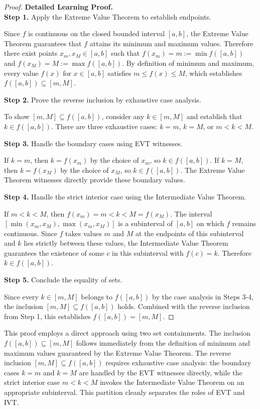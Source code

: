 \begin{proof}
\textbf{Detailed Learning Proof.}~\\

\textbf{Step 1.} Apply the Extreme Value Theorem to establish endpoints.

Since $f$ is continuous on the closed bounded interval $[a,b]$, the Extreme Value Theorem guarantees that $f$ attains its minimum and maximum values. Therefore there exist points $x_m, x_M \in [a,b]$ such that $f(x_m) = m := \min f([a,b])$ and $f(x_M) = M := \max f([a,b])$. By definition of minimum and maximum, every value $f(x)$ for $x \in [a,b]$ satisfies $m \leq f(x) \leq M$, which establishes $f([a,b]) \subseteq [m, M]$.

\textbf{Step 2.} Prove the reverse inclusion by exhaustive case analysis.

To show $[m,M] \subseteq f([a,b])$, consider any $k \in [m,M]$ and establish that $k \in f([a,b])$. There are three exhaustive cases: $k = m$, $k = M$, or $m < k < M$.

\textbf{Step 3.} Handle the boundary cases using EVT witnesses.

If $k = m$, then $k = f(x_m)$ by the choice of $x_m$, so $k \in f([a,b])$. If $k = M$, then $k = f(x_M)$ by the choice of $x_M$, so $k \in f([a,b])$. The Extreme Value Theorem witnesses directly provide these boundary values.

\textbf{Step 4.} Handle the strict interior case using the Intermediate Value Theorem.

If $m < k < M$, then $f(x_m) = m < k < M = f(x_M)$. The interval $[\min(x_m, x_M), \max(x_m, x_M)]$ is a subinterval of $[a,b]$ on which $f$ remains continuous. Since $f$ takes values $m$ and $M$ at the endpoints of this subinterval and $k$ lies strictly between these values, the Intermediate Value Theorem guarantees the existence of some $c$ in this subinterval with $f(c) = k$. Therefore $k \in f([a,b])$.

\textbf{Step 5.} Conclude the equality of sets.

Since every $k \in [m,M]$ belongs to $f([a,b])$ by the case analysis in Steps 3-4, the inclusion $[m,M] \subseteq f([a,b])$ holds. Combined with the reverse inclusion from Step 1, this establishes $f([a,b]) = [m,M]$.
\end{proof}

\begin{remark*}
This proof employs a direct approach using two set containments. The inclusion $f([a,b]) \subseteq [m,M]$ follows immediately from the definition of minimum and maximum values guaranteed by the Extreme Value Theorem. The reverse inclusion $[m,M] \subseteq f([a,b])$ requires exhaustive case analysis: the boundary cases $k = m$ and $k = M$ are handled by the EVT witnesses directly, while the strict interior case $m < k < M$ invokes the Intermediate Value Theorem on an appropriate subinterval. This partition cleanly separates the roles of EVT and IVT.
\end{remark*}

